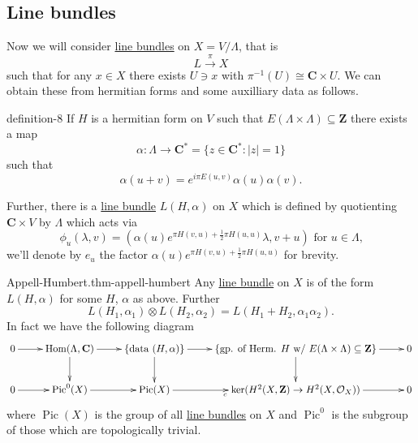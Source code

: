 \documentclass[10pt,]{book}
\numberwithin{equation}{section}
\newcommand{\sheaf}[1]{\operatorname{\mathcal{#1}}}
\newcommand{\ZZ}{\mathbf{Z}}
\newcommand{\CC}{\mathbf{C}}
\DeclareMathOperator{\Hom}{Hom}
\DeclareMathOperator{\Pic}{Pic}
\begin{document}
\subsection[{Line bundles}]{Line bundles}\label{subsection-6}
\hypertarget{p-57}{}%
Now we will consider \hyperref[def-line-bundle]{line bundles} on \(X = V/\Lambda\), that is%
\begin{equation*}
L\xrightarrow{\pi} X
\end{equation*}
such that for any \(x\in X\) there exists \(U\ni x\) with \(\pi^{-1} (U) \cong \CC \times U\). We can obtain these from hermitian forms and some auxilliary data as follows.%
\begin{definition}{}{definition-8}%
\hypertarget{p-58}{}%
If \(H\) is a hermitian form on \(V\) such that \(E(\Lambda\times\Lambda) \subseteq \ZZ\) there exists a map%
\begin{equation*}
\alpha \colon \Lambda \to \CC^*  = \{z\in \CC^* : |z| = 1\}
\end{equation*}
such that%
\begin{equation*}
\alpha(u + v) = e^{i\pi E(u,v)} \alpha(u) \alpha(v)\text{.}
\end{equation*}
%
\par
\hypertarget{p-59}{}%
Further, there is a \hyperref[def-line-bundle]{line bundle} \(L(H, \alpha)\) on \(X\) which is defined by quotienting \(\CC\times V\) by \(\Lambda\) which acts via%
\begin{equation*}
\phi_u(\lambda, v) = (\alpha(u)e^{\pi H(v,u) + \frac12 \pi H(u,u)}\lambda, v+u)\text{ for } u\in \Lambda\text{,}
\end{equation*}
we'll denote by \(e_u\) the factor \(\alpha(u)e^{\pi H(v,u) + \frac12 \pi H(u,u)}\) for brevity.%
\end{definition}
\begin{theorem}{Appell-Humbert.}{}{thm-appell-humbert}%
\hypertarget{p-60}{}%
Any \hyperref[def-line-bundle]{line bundle} on \(X\) is of the form \(L(H,\alpha)\) for some \(H\), \(\alpha\) as above. Further%
\begin{equation*}
L(H_1, \alpha_1) \otimes L(H_2, \alpha_2)  = L(H_1+ H_2, \alpha_1\alpha_2)\text{.}
\end{equation*}
In fact we have the following diagram%
\begin{equation*}
\xymatrix{
0 \ar[r] &
\Hom(\Lambda, \CC) \ar[r]\ar[d] &
\{\text{data } (H,\alpha)\} \ar[r]\ar[d] &
\{\text{gp. of Herm. } H \text{ w/ }E(\Lambda\times \Lambda) \subseteq \ZZ\} \ar[r]\ar[d] &
0 \\
0 \ar[r] &
\Pic^0(X) \ar[r] &
\Pic(X) \ar[r]_c &
\ker(H^2(X,\ZZ) \to H^2(X,\sheaf O_X)) \ar[r]&
0
}
\end{equation*}
where \(\Pic(X)\) is the group of all \hyperref[def-line-bundle]{line bundles} on \(X\) and \(\Pic^0\) is the subgroup of those which are topologically trivial.%
\end{theorem}
\end{document}
